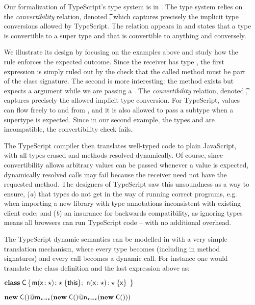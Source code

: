 \documentclass[acmlarge, anonymous, authordraft, review]{acmart} %
\begin{document}
\medskip

\noindent
Our formalization of TypeScript's type system is in
. The type system relies on the \emph{convertibility}
relation, denoted \ConvertE{}\t\tp, which captures precisely the implicit
type conversions allowed by TypeScript.  The relation appears in
 and states that a type is convertible to a super type and
that \any is convertible to anything and conversely.


We illustrate its design by focusing on the
examples above and study how the  rule enforces the
expected outcome.  Since the receiver has type \C, the first expression is
simply ruled out by the check that the called method must be part of the
class signature.  The second is more interesting: the method exists but
expects a \D argument while we are passing a \C.  The \emph{convertibility}
relation, denoted \ConvertE{}\t\tp, captures precisely the allowed
implicit type conversion.  For TypeScript, values can flow freely to and
from \any, and it is also allowed to pass a subtype when a supertype is
expected.  Since in our second example, the types \C and \D are
incompatible, the convertibility check fails.

The TypeScript compiler then translates well-typed code to plain JavaScript, with all types erased and methods resolved dynamically. Of course, since convertibility allows arbitrary values can be passed whenever a \any value is expected, dynamically resolved calls may fail because the receiver need not have the requested method. The designers of TypeScript saw this unsoundness as a way to
ensure, ({\em a}) that types do not get in the way of running correct
programs, e.g. when importing a new library with type annotations
inconsistent with existing client code; and ({\em b}) an insurance for
backwards compatibility, as ignoring types means all browsers can run
TypeScript code -- with no additional overhead.



The TypeScript dynamic semantics can be modelled in \kafka with a very simple translation mechanism, where every
type becomes \any  (including in method signatures) and every call becomes a dynamic call.  
For instance one would translate the class
definition and the last expression above as:

\medskip
\(
\Class \C {   \Mdef\m\x\any\any \this  ; \   \Mdef\n\x\any\any \x }
\)

\medskip

\(\DynCall {\New \C{}} \m {\DynCall {\New \C{}} \n {\New \C{}}} \)
\end{document}
